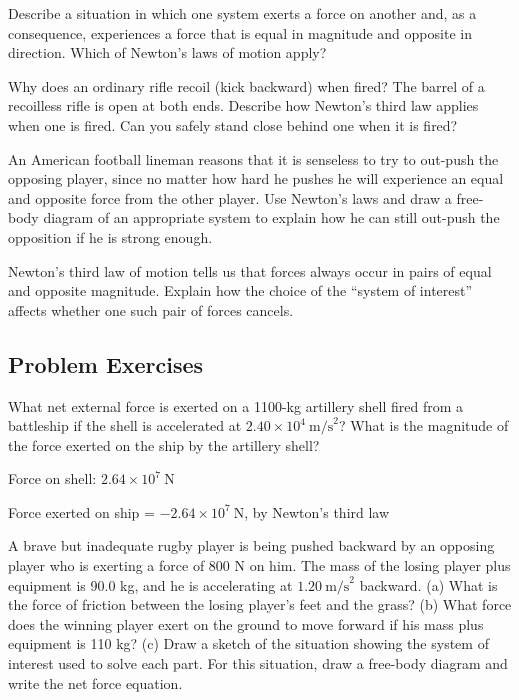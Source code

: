 \documentclass[
]{book}
\begin{document}
\hypertarget{fs-id2846557}{}
\leavevmode{}%
Describe a situation in which one system exerts a force on another and,
as a consequence, experiences a force that is equal in magnitude and
opposite in direction. Which of Newton's laws of motion apply?

\hypertarget{fs-id2661705}{}
\leavevmode{}%
Why does an ordinary rifle recoil (kick backward) when fired? The barrel
of a recoilless rifle is open at both ends. Describe how Newton's third
law applies when one is fired. Can you safely stand close behind one
when it is fired?

\hypertarget{fs-id2423524}{}
\leavevmode{}%
An American football lineman reasons that it is senseless to try to
out-push the opposing player, since no matter how hard he pushes he will
experience an equal and opposite force from the other player. Use
Newton's laws and draw a free-body diagram of an appropriate system to
explain how he can still out-push the opposition if he is strong enough.

\hypertarget{fs-id2355576}{}
\leavevmode{}%
Newton's third law of motion tells us that forces always occur in pairs
of equal and opposite magnitude. Explain how the choice of the ``system
of interest'' affects whether one such pair of forces cancels.

\hypertarget{fs-id1008305}{}
\hypertarget{problem-exercises-1}{%
\subsection{Problem Exercises}\label{problem-exercises-1}}

\hypertarget{fs-id1740619}{}
\leavevmode{}%
What net external force is exerted on a 1100-kg artillery shell fired
from a battleship if the shell is accelerated at
\({2\text{.}\text{40}\times\text{10}^{4}\ \text{m/s}^{2}}{}\)? What is the
magnitude of the force exerted on the ship by the artillery shell?

\leavevmode{}%
Force on shell:
\({2\text{.}{\text{64} \times \text{10}^{7}}\ \text{N}}{}\)

Force exerted on ship =
\({{- 2}\text{.}{\text{64} \times \text{10}^{7}}\ \text{N}}{}\), by
Newton's third law

\hypertarget{fs-id2300721}{}
\leavevmode{}%
A brave but inadequate rugby player is being pushed backward by an
opposing player who is exerting a force of 800 N on him. The mass of the
losing player plus equipment is 90.0 kg, and he is accelerating at
\({1\text{.}\text{20}\ \text{m/s}^{2}}{}\) backward. (a) What is the force
of friction between the losing player's feet and the grass? (b) What
force does the winning player exert on the ground to move forward if his
mass plus equipment is 110 kg? (c) Draw a sketch of the situation
showing the system of interest used to solve each part. For this
situation, draw a free-body diagram and write the net force equation.
\end{document}
